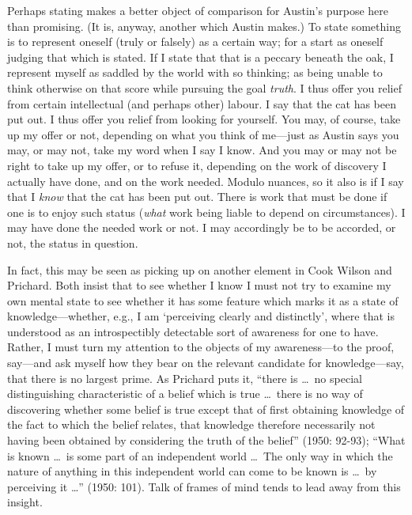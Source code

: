 Perhaps stating makes a better object of comparison for Austin’s purpose here than promising. (It is, anyway, another which Austin makes.) To state something is to represent oneself (truly or falsely) as a certain way; for a start as oneself judging that which is stated. If I state that that is a peccary beneath the oak, I represent myself as saddled by the world with so thinking; as being unable to think otherwise on that score while pursuing the goal \emph{truth}. I thus offer you relief from certain intellectual (and perhaps other) labour. I say that the cat has been put out. I thus offer you relief from looking for yourself. You may, of course, take up my offer or not, depending on what you think of me—just as Austin says you may, or may not, take my word when I say I know. And you may or may not be right to take up my offer, or to refuse it, depending on the work of discovery I actually have done, and on the work needed. Modulo nuances, so it also is if I say that I \emph{know} that the cat has been put out. There is work that must be done if one is to enjoy such status (\emph{what} work being liable to depend on circumstances). I may have done the needed work or not. I may accordingly be to be accorded, or not, the status in question.

In fact, this may be seen as picking up on another element in Cook Wilson and Prichard. Both insist that to see whether I know I must not try to examine my own mental state to see whether it has some feature which marks it as a state of knowledge---whether, e.g., I am `perceiving clearly and distinctly', where that is understood as an introspectibly detectable sort of awareness for one to have. Rather, I must turn my attention to the objects of my awareness---to the proof, say---and ask myself how they bear on the relevant candidate for knowledge—say, that there is no largest prime. As Prichard puts it, ``there is \ldots\ no special distinguishing characteristic of a belief which is true \ldots\ there is no way of discovering whether some belief is true except that of first obtaining knowledge of the fact to which the belief relates, that knowledge therefore necessarily not having been obtained by considering the truth of the belief'' (1950: 92-93); ``What is known \ldots\ is some part of an independent world \ldots\ The only way in which the nature of anything in this independent world can come to be known is \ldots\ by perceiving it \ldots'' (1950: 101).  Talk of frames of mind tends to lead away from this insight.

